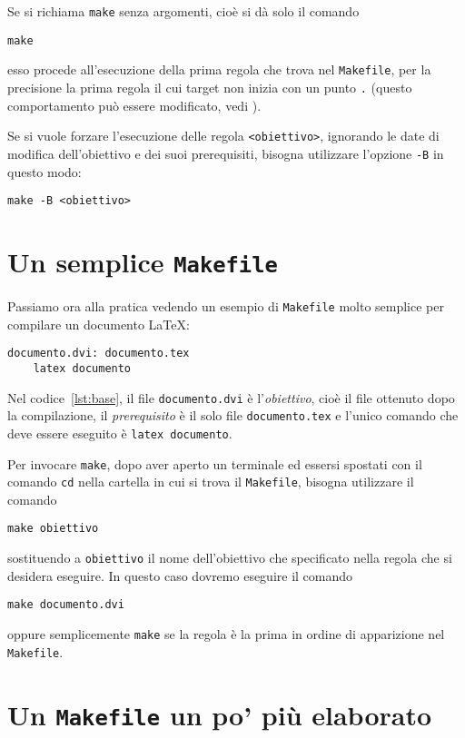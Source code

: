 Se si richiama \verb|make| senza argomenti, cioè si dà solo il comando
\begin{verbatim}
make
\end{verbatim}
esso procede all'esecuzione della prima regola che trova nel \verb|Makefile|,
per la precisione la prima regola il cui target non inizia con un punto \verb|.|
(questo comportamento può essere modificato, vedi \textcite[5]{gnu:make}).

Se si vuole forzare l'esecuzione delle regola \verb|<obiettivo>|, ignorando le
date di modifica dell'obiettivo e dei suoi prerequisiti, bisogna utilizzare
l'opzione \texttt{-B} in questo modo:
\begin{verbatim}
make -B <obiettivo>
\end{verbatim}

\section{Un semplice \texttt{Makefile}}
\label{sec:makefile-semplice}

Passiamo ora alla pratica vedendo un esempio di \verb|Makefile| molto semplice
per compilare un documento \LaTeX{}:
\begin{lstlisting}[caption={Un semplice \texttt{Makefile}.},label=lst:base]
documento.dvi: documento.tex
	latex documento
\end{lstlisting}
Nel codice~\ref{lst:base}, il file \verb|documento.dvi| è l'\emph{obiettivo},
cioè il file ottenuto dopo la compilazione, il \emph{prerequisito} è il solo
file \verb|documento.tex| e l'unico comando che deve essere eseguito è
\verb|latex documento|.

Per invocare \verb|make|, dopo aver aperto un terminale ed essersi spostati con
il comando \verb|cd| nella cartella in cui si trova il \verb|Makefile|, bisogna
utilizzare il comando
\begin{verbatim}
make obiettivo
\end{verbatim}
sostituendo a \verb|obiettivo| il nome dell'obiettivo che specificato nella
regola che si desidera eseguire.  In questo caso dovremo eseguire il comando
\begin{verbatim}
make documento.dvi
\end{verbatim}
oppure semplicemente \verb|make| se la regola è la prima in ordine di
apparizione nel \verb|Makefile|.


\section{Un \texttt{Makefile} un po' più elaborato}
\label{sec:makefile-elaborato}

